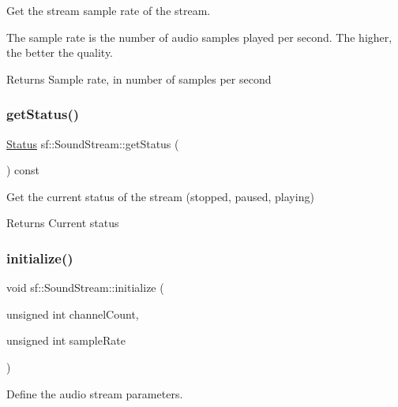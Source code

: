 Get the stream sample rate of the stream. 

The sample rate is the number of audio samples played per second. The higher, the better the quality.

\begin{DoxyReturn}{Returns}
Sample rate, in number of samples per second 
\end{DoxyReturn}
\mbox{\label{classsf_1_1_sound_stream_a64a8193ed728da37c115c65de015849f}} 
\subsubsection{\texorpdfstring{get\+Status()}{getStatus()}}
{\footnotesize\ttfamily \hyperlink{classsf_1_1_sound_source_ac43af72c98c077500b239bc75b812f03}{Status} sf\+::\+Sound\+Stream\+::get\+Status (\begin{DoxyParamCaption}{ }\end{DoxyParamCaption}) const}



Get the current status of the stream (stopped, paused, playing) 

\begin{DoxyReturn}{Returns}
Current status 
\end{DoxyReturn}
\mbox{\label{classsf_1_1_sound_stream_a9c351711198ee1aa77c2fefd3ced4d2c}} 
\subsubsection{\texorpdfstring{initialize()}{initialize()}}
{\footnotesize\ttfamily void sf\+::\+Sound\+Stream\+::initialize (\begin{DoxyParamCaption}\item[{unsigned int}]{channel\+Count,  }\item[{unsigned int}]{sample\+Rate }\end{DoxyParamCaption})\hspace{0.3cm}{\ttfamily [protected]}}



Define the audio stream parameters. 

